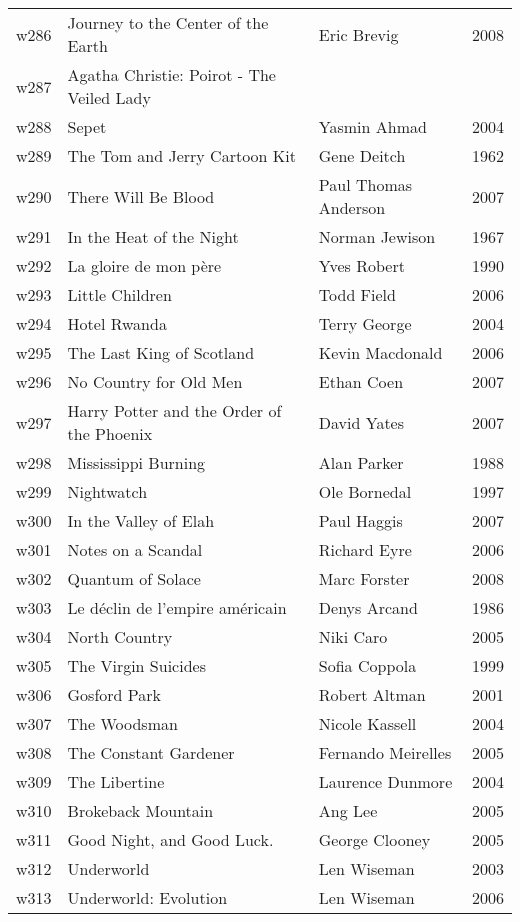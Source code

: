 \documentclass{article}
\begin{document}
\begin {center}
\begin{longtable}{l p{10cm} l l}
w286 & Journey to the Center of the Earth & Eric Brevig & 2008 \\
w287 & Agatha Christie: Poirot - The Veiled Lady &  &  \\
w288 & Sepet & Yasmin Ahmad & 2004 \\
w289 & The Tom and Jerry Cartoon Kit & Gene Deitch & 1962 \\
w290 & There Will Be Blood & Paul Thomas Anderson & 2007 \\
w291 & In the Heat of the Night & Norman Jewison & 1967 \\
w292 & La gloire de mon père & Yves Robert & 1990 \\
w293 & Little Children & Todd Field & 2006 \\
w294 & Hotel Rwanda & Terry George & 2004 \\
w295 & The Last King of Scotland & Kevin Macdonald & 2006 \\
w296 & No Country for Old Men & Ethan Coen & 2007 \\
w297 & Harry Potter and the Order of the Phoenix & David Yates & 2007 \\
w298 & Mississippi Burning & Alan Parker & 1988 \\
w299 & Nightwatch & Ole Bornedal & 1997 \\
w300 & In the Valley of Elah & Paul Haggis & 2007 \\
w301 & Notes on a Scandal & Richard Eyre & 2006 \\
w302 & Quantum of Solace & Marc Forster & 2008 \\
w303 & Le déclin de l'empire américain & Denys Arcand & 1986 \\
w304 & North Country & Niki Caro & 2005 \\
w305 & The Virgin Suicides & Sofia Coppola & 1999 \\
w306 & Gosford Park & Robert Altman & 2001 \\
w307 & The Woodsman & Nicole Kassell & 2004 \\
w308 & The Constant Gardener & Fernando Meirelles & 2005 \\
w309 & The Libertine & Laurence Dunmore & 2004 \\
w310 & Brokeback Mountain & Ang Lee & 2005 \\
w311 & Good Night, and Good Luck. & George Clooney & 2005 \\
w312 & Underworld & Len Wiseman & 2003 \\
w313 & Underworld: Evolution & Len Wiseman & 2006 \\

\end{longtable}
\end{center}
\end{document}
